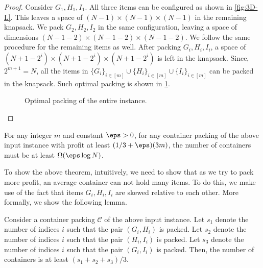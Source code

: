 \begin{proof}
    Consider $G_1,H_1,I_1$. All three items can be configured as shown in \cref{fig:3D-L}. This leaves a space of $(N-1)\times (N-1)\times (N-1)$
    in the remaining knapsack.
    We pack $G_2,H_2,I_2$ in the same configuration, leaving a space of dimensions $(N-1-2)\times (N-1-2)\times (N-1-2)$.
    We follow the same procedure for the remaining items as well. After packing $G_i,H_i,I_i$, a space of $(N+1-2^i)\times (N+1-2^i)\times (N+1-2^i)$ is left in the knapsack.
    Since, $2^{m+1}=N$, all the items in $\{G_i\}_{i\in[m]}\cup\{H_i\}_{i\in[m]}\cup\{I_i\}_{i\in[m]}$
    can be packed in the knapsack. Such optimal packing is shown in \cref{fig:opt-hardness}.
    \begin{figure}
        \centering
        \begin{minipage}{0.45\textwidth}
            \centering
            \caption{Packing $G_1,H_1,I_1$.}
            \label{fig:3D-L}
        \end{minipage}\hfill
        \begin{minipage}{0.45\textwidth}
            \centering
            \caption{Optimal packing of the entire instance.}
            \label{fig:opt-hardness}
        \end{minipage}
    \end{figure}
\end{proof}
\begin{theorem}
\label{thm:hardness}
    For any integer $m$ and constant $\eps>0$, for any container packing of the above input instance with profit at least $(1/3+\eps)(3m)$, the number of containers must be at least $\Omega(\eps\log N)$.
\end{theorem}
To show the above theorem, intuitively, we need to show that as we try to pack more profit, an average container can not hold many items.
To do this, we make use of the fact that items $G_i, H_i, I_i$ are skewed relative to each other. More formally, we show the following lemma.
\begin{lemma}
\label{lem:hardness}
    Consider a container packing $\mathcal C$ of the above input instance. Let $s_1$ denote the number of indices $i$ such that the pair $(G_i,H_i)$ is packed.
    Let $s_2$ denote the number of indices $i$ such that the pair $(H_i,I_i)$ is packed.
    Let $s_3$ denote the number of indices $i$ such that the pair $(G_i,I_i)$ is packed.
    Then, the number of containers is at least $(s_1+s_2+s_3)/3$.
\end{lemma}
